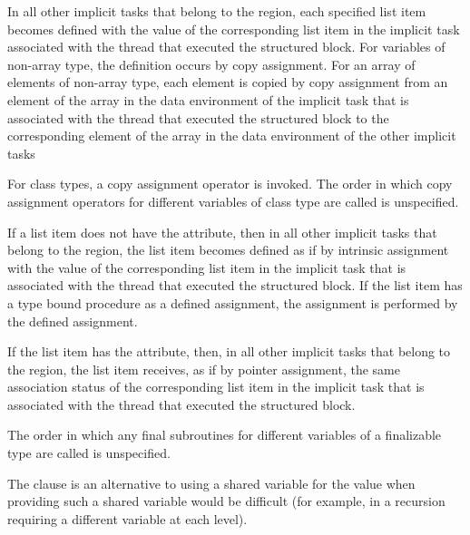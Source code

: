 \begin{ccppspecific}
In all other implicit tasks that belong to the  region, each 
specified list item becomes defined with the value of the corresponding list 
item in the implicit task associated with the thread that executed the 
structured block. For variables of non-array type, the definition occurs by 
copy assignment. For an array of elements of non-array type, each element is
copied by copy assignment from an element of the array in the data environment of the
implicit task that is associated with the thread that executed the structured 
block to the corresponding element of the array in the data environment of the 
other implicit tasks
\end{ccppspecific}

\begin{cppspecific}
For class types, a copy assignment operator is invoked. The order in which copy
assignment operators for different variables of class type are called is unspecified.
\end{cppspecific}

\begin{fortranspecific}
If a list item does not have the  attribute, then in all other 
implicit tasks that belong to the  region, the list item becomes 
defined as if by intrinsic assignment with the value of the corresponding list 
item in the implicit task that is associated with the thread that executed the 
structured block.  If the list item has a type bound procedure as a defined 
assignment, the assignment is performed by the defined assignment.

If the list item has the  attribute, then, in all other implicit 
tasks that belong to the  region, the list item receives, as if by 
pointer assignment, the same association status of the corresponding list item in the 
implicit task that is associated with the thread that executed the structured block.

The order in which any final subroutines for different variables of a finalizable 
type are called is unspecified.
\end{fortranspecific}

\begin{note}
The  clause is an alternative to using a shared variable for the
value when providing such a shared variable would be difficult (for example, in a
recursion requiring a different variable at each level).
\end{note}

